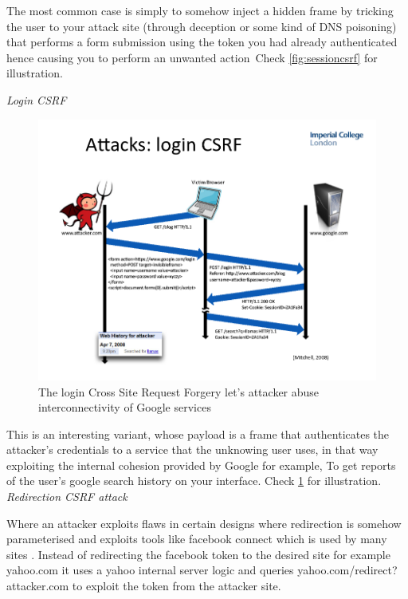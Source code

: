 \documentclass[a4paper,12pt]{paper}
\begin{document}
The most common case is simply to somehow inject a hidden frame by tricking the user to your attack site (through deception or some kind of DNS poisoning)
that performs a form submission using the token you had already authenticated hence causing you to perform an unwanted action\ Check \ref{fig:sessioncsrf}
for illustration.

\emph{Login CSRF}

\begin{figure}
\centering
\includegraphics[width=1\textwidth]{./logincsrf.png}
\caption{\label{fig:logincsrf}The login Cross Site Request Forgery let's attacker abuse interconnectivity of Google services}
\end{figure}

This is an interesting variant, whose payload is a frame that authenticates the attacker's credentials to a service that the unknowing user uses, in that way exploiting
the internal cohesion provided by Google for example, To get reports of the user's google search history on your interface. Check \ref{fig:logincsrf}
for illustration.
\emph{Redirection CSRF attack}


Where an attacker exploits flaws in certain designs where redirection is somehow parameterised and exploits tools like facebook connect which is used by many sites .
Instead of redirecting the facebook token to the desired site for example yahoo.com it uses a yahoo internal server logic and queries yahoo.com/redirect?attacker.com to exploit
the token from the attacker site.
\end{document}

